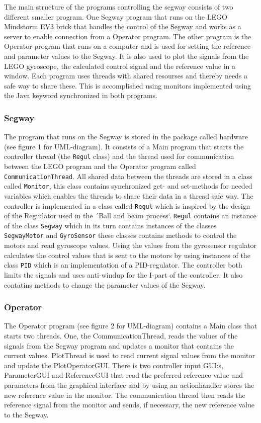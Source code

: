 The main structure of the programs controlling the segway consists of two different smaller program. One Segway program that runs on the LEGO Mindstorm EV3 brick that handles the control of the Segway and works as a server to enable connection from a Operator program. The other program is the Operator program that runs on a computer and is used for setting the reference- and parameter values to the Segway. It is also used to plot the signals from the LEGO gyroscope, the calculated control signal and the reference value in a window. Each program uses threads with shared resourses and thereby needs a safe way to share these. This is accomplished using monitors implemented using the Java keyword synchronized in both programs.


\subsubsection{Segway}
The program that runs on the Segway is stored in the package called hardware (see figure 1 for UML-diagram). It consists of a Main program that starts the controller thread (the \texttt{Regul} class) and the thread used for communication between the LEGO program and the Operator program called \texttt{CommunicationThread}. All shared data between the threads are stored in a class called \texttt{Monitor}, this class contains synchronized get- and set-methods for needed variables which enables the threads to share their data in a thread safe way. The controller is implemented in a class called \texttt{Regul} which is inspired by the design of the Regiulator used in the ´Ball and beam process`. \texttt{Regul} contains an instance of the class \texttt{Segway} which in its turn contains instances of the classes \texttt{SegwayMotor} and \texttt{GyroSensor} these classes contains methods to control the motors and read gyroscope values. Using the values from the gyrosensor regulator calculates the control values that is sent to the motors by using instances of the class \texttt{PID} which is an implementation of a PID-regulator. The controller both limits the signals and uses anti-windup for the I-part of the controller. It also contatins methods to change the parameter values of the Segway.


\subsubsection{Operator}
The Operator program (see figure 2 for UML-diagram)  contains a Main class that starts two threads. One, the CommunicationThread, reads the values of the signals from the Segway program and updates a monitor that contains the current values. PlotThread is used to read current signal values from the monitor and update the PlotOperatorGUI. There is two controller input GUI:s, ParameterGUI and ReferenceGUI that read the preferred reference value and parameters from the graphical interface and by using an actionhandler stores the new reference value in the monitor. The communication thread then reads the reference signal from the monitor and sends, if necessary, the new reference value to the Segway.

